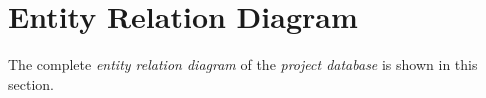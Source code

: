 \chapter{Entity Relation Diagram}
\label{app:erdia}

The complete \textit{entity relation diagram} of the \textit{project database} is shown in this section.
